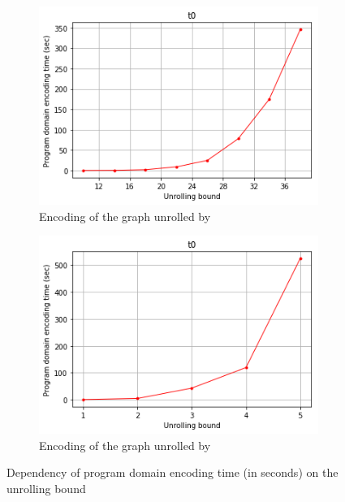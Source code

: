 \begin{figure}[t]
\begin{subfigure}{.45\textwidth}
\includegraphics[width=\textwidth,keepaspectratio]{img/my/performance/new/new-t.png}
\caption{Encoding of the graph unrolled by \porthos[2]}
\label{dep:time:new}
\end{subfigure}
\hfill
%
\begin{subfigure}{.45\textwidth}
\includegraphics[width=\textwidth,keepaspectratio]{img/my/performance/new/old-t.png}
\caption{Encoding of the graph unrolled by \porthos[1]}
\label{dep:time:old}
\end{subfigure}
%
\caption{Dependency of program domain encoding time (in seconds) on the unrolling bound}
\label{dep:time}
\end{figure}

